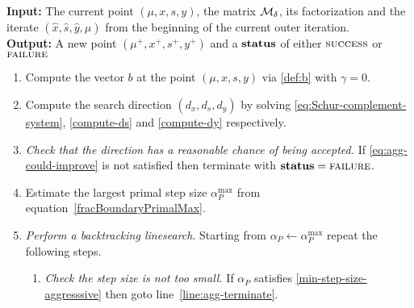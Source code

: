 \documentclass{article}
\begin{document}
\begin{algorithm}[H]
\textbf{Input:} The current point $(\mu, x, s, y)$, the matrix $\mathcal{M}_{\delta}$, its factorization and the iterate $(\hat{x}, \hat{s},  \hat{y}, \hat{\mu})$ from the beginning of the current outer iteration.  \\
\textbf{Output:} A new point $(\mu^{+}, x^{+}, s^{+}, y^{+})$ and a $\textbf{status}$ of either $\textsc{success}$ or $\textsc{failure}$
\begin{enumerate}[label*=A.{\arabic*}]
\item Compute the vector $b$ at the point $(\mu, x, s, y)$ via \eqref{def:b} with $\gamma = 0$.
\item Compute the search direction $(d_{x}, d_{s}, d_{y})$ by solving \eqref{eq:Schur-complement-system}, \eqref{compute-ds} and \eqref{compute-dy} respectively.
\item \emph{Check that the direction has a reasonable chance of being accepted.} If \eqref{eq:agg-could-improve} is not satisfied then terminate with $\textbf{status} = \textsc{failure}$.
\item Estimate the largest primal step size $\alpha^{\max}_{P}$ from equation~\eqref{fracBoundaryPrimalMax}.
\item \label{agg:line:back-track} \emph{Perform a backtracking linesearch}. Starting from $\alpha_{P} \gets \alpha^{\max}_{P}$ repeat the following steps.
\begin{enumerate}[label*=.{\arabic*}]
\item \label{line:agg-back-too-small} \emph{Check the step size is not too small.} If $\alpha_{P}$ satisfies \eqref{min-step-size-aggresssive} then goto line~\ref{line:agg-terminate}.

\end{enumerate}
\end{enumerate}
\end{algorithm}
\end{document}
